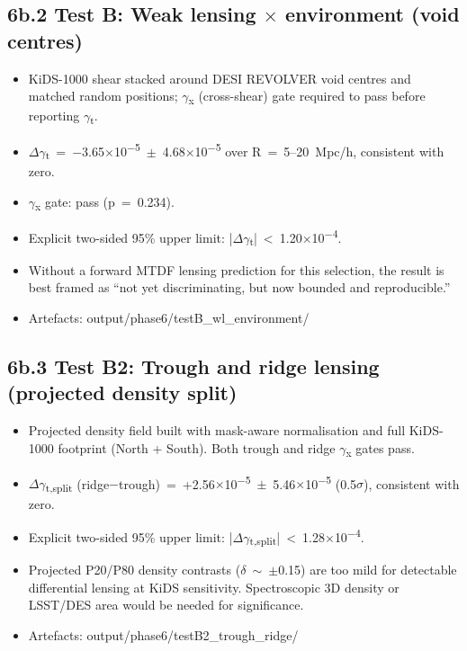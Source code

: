 \documentclass[11pt,a4paper]{article}
\begin{document}
\subsection{6b.2 Test B: Weak lensing $\times$ environment (void centres)}
\begin{itemize}
  \item KiDS-1000 shear stacked around DESI REVOLVER void centres and matched random positions; $\gamma$\textsubscript{x} (cross-shear) gate required to pass before reporting $\gamma$\textsubscript{t}.
  \item $\Delta$$\gamma$\textsubscript{t}~=~$-$3.65$\times$10\textsuperscript{$-$5}~$\pm$~4.68$\times$10\textsuperscript{$-$5} over R~=~5--20~Mpc/\allowbreak{}h, consistent with zero.
  \item $\gamma$\textsubscript{x} gate: pass (p~=~0.234).
  \item Explicit two-sided 95\% upper limit: |$\Delta$$\gamma$\textsubscript{t}|~<~1.20$\times$10\textsuperscript{$-$4}.
  \item Without a forward MTDF lensing prediction for this selection, the result is best framed as ``not yet discriminating, but now bounded and reproducible.''
  \item Artefacts: output/\allowbreak{}phase6/\allowbreak{}testB\_\allowbreak{}wl\_\allowbreak{}environment/\allowbreak{}
\end{itemize}

\subsection{6b.3 Test B2: Trough and ridge lensing (projected density split)}
\begin{itemize}
  \item Projected density field built with mask-aware normalisation and full KiDS-1000 footprint (North + South). Both trough and ridge $\gamma$\textsubscript{x} gates pass.
  \item $\Delta$$\gamma$\textsubscript{t,split} (ridge$-$trough)~=~+2.56$\times$10\textsuperscript{$-$5}~$\pm$~5.46$\times$10\textsuperscript{$-$5} (0.5$\sigma$), consistent with zero.
  \item Explicit two-sided 95\% upper limit: |$\Delta$$\gamma$\textsubscript{t,split}|~<~1.28$\times$10\textsuperscript{$-$4}.
  \item Projected P20/\allowbreak{}P80 density contrasts ($\delta$~$\sim$~$\pm$0.15) are too mild for detectable differential lensing at KiDS sensitivity. Spectroscopic 3D density or LSST/\allowbreak{}DES area would be needed for significance.
  \item Artefacts: output/\allowbreak{}phase6/\allowbreak{}testB2\_\allowbreak{}trough\_\allowbreak{}ridge/\allowbreak{}
\end{itemize}
\end{document}
